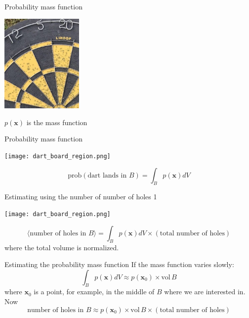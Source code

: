 \documentclass{beamer}
\begin{document}
\begin{frame}{Probability mass function}
\color{reddish}
\begin{center}
\includegraphics[width=4cm]{dart_board_zoom.png}
\end{center}
\begin{center}
\color{black}
$p(\mathbf{x})$ is the mass function
\end{center}
\color{black}
\end{frame}


\begin{frame}{Probability mass function}
\begin{center}
\texttt{[image: dart\_board\_region.png]}
\end{center}
\color{dark}
$$\mbox{prob}(\mbox{dart lands in }B)=\int_B p(\mathbf{x})dV$$
\color{black}
\end{frame}


\begin{frame}{Estimating using the number of number of holes 1}
\color{reddish}
\begin{center}
\texttt{[image: dart\_board\_region.png]}
\end{center}
\color{dark}
$$\langle \mbox{number of holes in }B\rangle = \int_B p(\mathbf{x})dV \times (\mbox{total number of holes})$$
\color{black}
where the total volume is normalized.
\end{frame}

\begin{frame}{Estimating the probability mass function}
\color{black}
If the mass function varies slowly:
\color{dark}
$$\int_B p(\mathbf{x})dV\approx p(\mathbf{x}_0) \times \mbox{vol}\,B$$
\color{black}
where $\textbf{x}_0$ is a point, for example, in the middle of $B$ where we are interested in. Now
\color{dark}
$$\mbox{number of holes in }B \approx p(\mathbf{x}_0) \times \mbox{vol}\,B \times (\mbox{total number of holes})$$
\color{black}
\end{frame}
\end{document}
